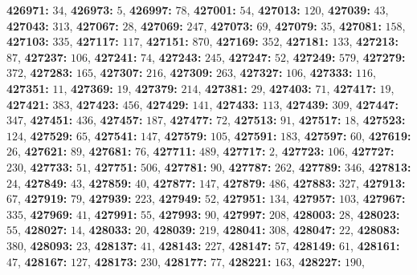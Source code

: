 \textsf{\bfseries 426971:} $34$, \textsf{\bfseries 426973:} $5$, \textsf{\bfseries 426997:} $78$, \textsf{\bfseries 427001:} $54$, \textsf{\bfseries 427013:} $120$, \textsf{\bfseries 427039:} $43$, \textsf{\bfseries 427043:} $313$, \textsf{\bfseries 427067:} $28$, \textsf{\bfseries 427069:} $247$, \textsf{\bfseries 427073:} $69$, \textsf{\bfseries 427079:} $35$, \textsf{\bfseries 427081:} $158$, \textsf{\bfseries 427103:} $335$, \textsf{\bfseries 427117:} $117$, \textsf{\bfseries 427151:} $870$, \textsf{\bfseries 427169:} $352$, \textsf{\bfseries 427181:} $133$, \textsf{\bfseries 427213:} $87$, \textsf{\bfseries 427237:} $106$, \textsf{\bfseries 427241:} $74$, \textsf{\bfseries 427243:} $245$, \textsf{\bfseries 427247:} $52$, \textsf{\bfseries 427249:} $579$, \textsf{\bfseries 427279:} $372$, \textsf{\bfseries 427283:} $165$, \textsf{\bfseries 427307:} $216$, \textsf{\bfseries 427309:} $263$, \textsf{\bfseries 427327:} $106$, \textsf{\bfseries 427333:} $116$, \textsf{\bfseries 427351:} $11$, \textsf{\bfseries 427369:} $19$, \textsf{\bfseries 427379:} $214$, \textsf{\bfseries 427381:} $29$, \textsf{\bfseries 427403:} $71$, \textsf{\bfseries 427417:} $19$, \textsf{\bfseries 427421:} $383$, \textsf{\bfseries 427423:} $456$, \textsf{\bfseries 427429:} $141$, \textsf{\bfseries 427433:} $113$, \textsf{\bfseries 427439:} $309$, \textsf{\bfseries 427447:} $347$, \textsf{\bfseries 427451:} $436$, \textsf{\bfseries 427457:} $187$, \textsf{\bfseries 427477:} $72$, \textsf{\bfseries 427513:} $91$, \textsf{\bfseries 427517:} $18$, \textsf{\bfseries 427523:} $124$, \textsf{\bfseries 427529:} $65$, \textsf{\bfseries 427541:} $147$, \textsf{\bfseries 427579:} $105$, \textsf{\bfseries 427591:} $183$, \textsf{\bfseries 427597:} $60$, \textsf{\bfseries 427619:} $26$, \textsf{\bfseries 427621:} $89$, \textsf{\bfseries 427681:} $76$, \textsf{\bfseries 427711:} $489$, \textsf{\bfseries 427717:} $2$, \textsf{\bfseries 427723:} $106$, \textsf{\bfseries 427727:} $230$, \textsf{\bfseries 427733:} $51$, \textsf{\bfseries 427751:} $506$, \textsf{\bfseries 427781:} $90$, \textsf{\bfseries 427787:} $262$, \textsf{\bfseries 427789:} $346$, \textsf{\bfseries 427813:} $24$, \textsf{\bfseries 427849:} $43$, \textsf{\bfseries 427859:} $40$, \textsf{\bfseries 427877:} $147$, \textsf{\bfseries 427879:} $486$, \textsf{\bfseries 427883:} $327$, \textsf{\bfseries 427913:} $67$, \textsf{\bfseries 427919:} $79$, \textsf{\bfseries 427939:} $223$, \textsf{\bfseries 427949:} $52$, \textsf{\bfseries 427951:} $134$, \textsf{\bfseries 427957:} $103$, \textsf{\bfseries 427967:} $335$, \textsf{\bfseries 427969:} $41$, \textsf{\bfseries 427991:} $55$, \textsf{\bfseries 427993:} $90$, \textsf{\bfseries 427997:} $208$, \textsf{\bfseries 428003:} $28$, \textsf{\bfseries 428023:} $55$, \textsf{\bfseries 428027:} $14$, \textsf{\bfseries 428033:} $20$, \textsf{\bfseries 428039:} $219$, \textsf{\bfseries 428041:} $308$, \textsf{\bfseries 428047:} $22$, \textsf{\bfseries 428083:} $380$, \textsf{\bfseries 428093:} $23$, \textsf{\bfseries 428137:} $41$, \textsf{\bfseries 428143:} $227$, \textsf{\bfseries 428147:} $57$, \textsf{\bfseries 428149:} $61$, \textsf{\bfseries 428161:} $47$, \textsf{\bfseries 428167:} $127$, \textsf{\bfseries 428173:} $230$, \textsf{\bfseries 428177:} $77$, \textsf{\bfseries 428221:} $163$, \textsf{\bfseries 428227:} $190$, 
